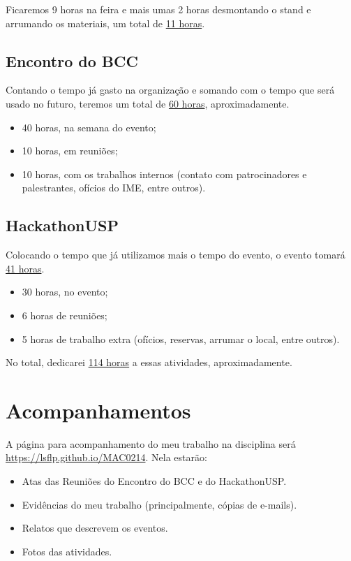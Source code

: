 \documentclass[12pt,letterpaper]{article}
\begin{document}
	Ficaremos 9 horas na feira e mais umas 2 horas desmontando o stand e arrumando os materiais, um total de \underline{11 horas}.
	
	\subsection{Encontro do BCC}
	
	Contando o tempo já gasto na organização e somando com o tempo que será usado no futuro, teremos um total de \underline{60 horas}, aproximadamente.
	\begin{itemize}
		\item 40 horas, na semana do evento;
		\item 10 horas, em reuniões;
		\item 10 horas, com os trabalhos internos (contato com patrocinadores e palestrantes, ofícios do IME, entre outros).
	\end{itemize}
	
	\subsection{HackathonUSP}
	
	Colocando o tempo que já utilizamos mais o tempo do evento, o evento tomará \underline{41 horas}.
	\begin{itemize}
		\item 30 horas, no evento;
		\item 6 horas de reuniões; 
		\item 5 horas de trabalho extra (ofícios, reservas, arrumar o local, entre outros).
	\end{itemize}
	
	No total, dedicarei \underline{114 horas} a essas atividades, aproximadamente.
	
	\section{Acompanhamentos}
	
	A página para acompanhamento do meu trabalho na disciplina será \url{https://lsflp.github.io/MAC0214}. Nela estarão:
	
	\begin{itemize}
		\item Atas das Reuniões do Encontro do BCC e do HackathonUSP.
		\item Evidências do meu trabalho (principalmente, cópias de e-mails).
		\item Relatos que descrevem os eventos.
		\item Fotos das atividades.
	\end{itemize}

			 
\end{document}
